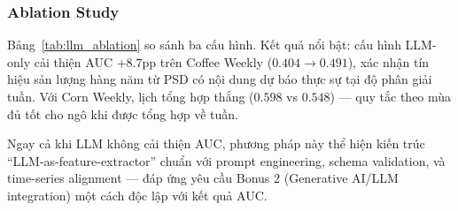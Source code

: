 \subsubsection{Ablation Study}

Bảng~\ref{tab:llm_ablation} so sánh ba cấu hình. Kết quả nổi bật:
cấu hình LLM-only cải thiện AUC $+8.7$pp trên Coffee Weekly
($0.404 \to 0.491$), xác nhận tín hiệu sản lượng hàng năm từ PSD có
nội dung dự báo thực sự tại độ phân giải tuần.
Với Corn Weekly, lịch tổng hợp thắng ($0.598$ vs $0.548$) — quy tắc
theo mùa đủ tốt cho ngô khi được tổng hợp về tuần.

Ngay cả khi LLM không cải thiện AUC, phương pháp này thể hiện kiến trúc
``LLM-as-feature-extractor'' chuẩn với prompt engineering, schema validation,
và time-series alignment — đáp ứng yêu cầu Bonus 2 (Generative AI/LLM integration)
một cách độc lập với kết quả AUC.
